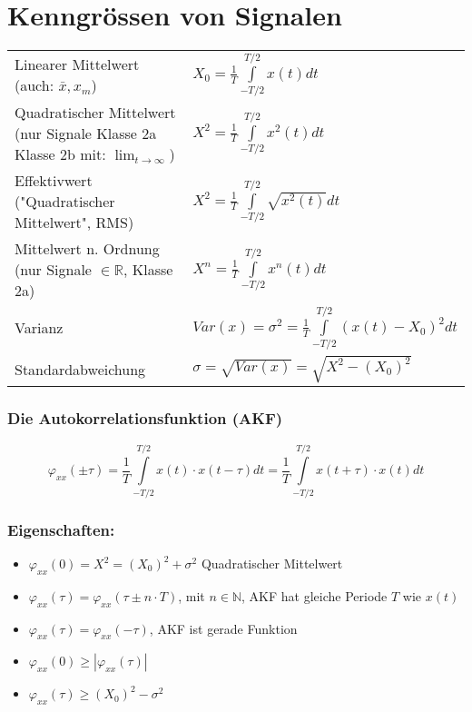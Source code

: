 \section{Kenngrössen von Signalen}
\begin{tabular}{p{6cm}p{12cm}}
  Linearer Mittelwert
  \newline \tiny(auch: $ \bar{x}, x_m$)                                         &
  $X_0 = \frac{1}{T} \int \limits _{-T/2}^{T/2} x(t) dt $                         \\
  Quadratischer Mittelwert
  \newline  \tiny(nur Signale Klasse 2a \newline
  Klasse 2b mit: $\lim_{t \to \infty}$)                                         &
  $X^2 = \frac{1}{T} \int \limits _{-T/2}^{T/2} x^2(t) dt$                        \\
  Effektivwert \newline \tiny{("Quadratischer Mittelwert", RMS)}                &
  $X^2 = \frac{1}{T} \int \limits _{-T/2}^{T/2} \sqrt{x^2(t)} dt $                \\
  Mittelwert n. Ordnung \newline \tiny(nur Signale $\in \mathbb{R}$, Klasse 2a) &
  $X^n = \frac{1}{T} \int \limits _{-T/2} ^{T/2} x^n(t)dt$                        \\
  Varianz                                                                       &
  $Var(x) = \sigma^2 = \frac{1}{T} \int \limits _{-T/2} ^{T/2} (x(t) - X_0)^2 dt$ \\
  Standardabweichung                                                            &
  $\sigma = \sqrt{Var(x)} = \sqrt{X^2 - (X_0)^2}$                                 \\
\end{tabular}

\subsubsection*{Die Autokorrelationsfunktion (AKF)}
$$ \varphi_{xx}(\pm \tau) = \frac{1}{T} \int \limits _{-T/2} ^{T/2} x(t) \cdot x(t- \tau) dt
  = \frac{1}{T} \int \limits _{-T/2} ^{T/2} x(t + \tau) \cdot x(t)dt$$
\subsubsection*{Eigenschaften:}
\begin{itemize}
  \item $\varphi_{xx}(0) = X^2 = (X_0)^2 + \sigma^2$ \tiny Quadratischer Mittelwert \normalsize
  \item $\varphi_{xx}(\tau) = \varphi_{xx}(\tau \pm n \cdot T)$, mit $n \in \mathbb{N}$,
        AKF hat gleiche Periode $T$ wie $x(t)$
  \item $\varphi_{xx}(\tau) = \varphi_{xx}(-\tau)$, AKF ist gerade Funktion
  \item $\varphi_{xx}(0) \geq \left|\varphi_{xx}(\tau)\right|$
  \item $\varphi_{xx}(\tau) \geq (X_0)^2 - \sigma^2$
\end{itemize}

